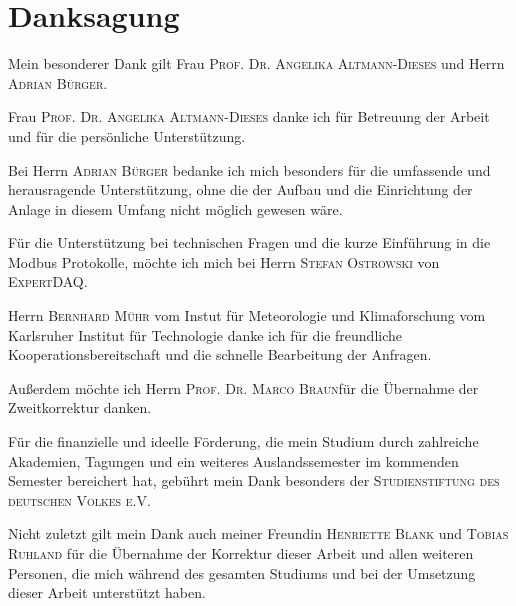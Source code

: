%
%
%
\chapter*{Danksagung}
\thispagestyle{empty}

\noindent Mein besonderer Dank gilt Frau \textsc{Prof. Dr. Angelika Altmann-Dieses} und Herrn \textsc{Adrian Bürger}.

\noindent Frau \textsc{Prof. Dr. Angelika Altmann-Dieses} danke ich für Betreuung der Arbeit und für die persönliche Unterstützung.

\noindent Bei Herrn \textsc{Adrian Bürger} bedanke ich mich besonders für die umfassende und herausragende Unterstützung, ohne die der Aufbau und die Einrichtung der Anlage in diesem Umfang nicht möglich gewesen wäre.

\noindent Für die Unterstützung bei technischen Fragen und die kurze Einführung in die Modbus Protokolle, möchte ich mich bei Herrn \textsc{Stefan Ostrowski} von \textsc{ExpertDAQ}.

\noindent Herrn \textsc{Bernhard Mühr} vom Instut für Meteorologie und Klimaforschung vom Karlsruher Institut für Technologie danke ich für die freundliche Kooperationsbereitschaft und die schnelle Bearbeitung der Anfragen.

\noindent Außerdem möchte ich Herrn \textsc{Prof. Dr. Marco Braun}für die Übernahme der Zweitkorrektur danken.

\noindent Für die finanzielle und ideelle Förderung, die mein Studium durch zahlreiche Akademien, Tagungen und ein weiteres Auslandssemester im kommenden Semester bereichert hat, gebührt mein Dank besonders der \textsc{Studienstiftung des deutschen Volkes e.V.}

\noindent Nicht zuletzt gilt mein Dank auch meiner Freundin \textsc{Henriette Blank} und \textsc{Tobias Ruhland} für die Übernahme der Korrektur dieser Arbeit und allen weiteren Personen, die mich während des gesamten Studiums und bei der Umsetzung dieser Arbeit unterstützt haben.
